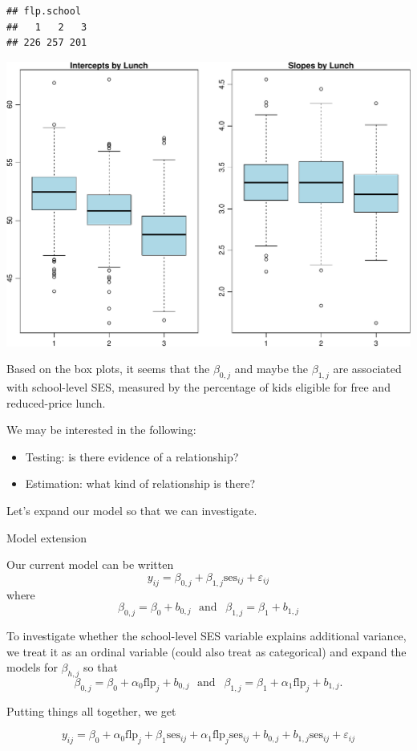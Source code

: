 \documentclass[ignorenonframetext,]{beamer}
\providecommand{\tightlist}{%
  \setlength{\itemsep}{0pt}\setlength{\parskip}{0pt}}
\begin{document}
\begin{frame}[fragile]{}

\begin{verbatim}
## flp.school
##   1   2   3 
## 226 257 201
\end{verbatim}

\includegraphics{ancova_01_deck_files/figure-beamer/ses2-1.pdf}

\end{frame}

\begin{frame}{}

Based on the box plots, it seems that the \(\beta_{0,j}\) and maybe the
\(\beta_{1,j}\) are associated with school-level SES, measured by the
percentage of kids eligible for free and reduced-price lunch.

We may be interested in the following:

\begin{itemize}
\tightlist
\item
  Testing: is there evidence of a relationship?
\item
  Estimation: what kind of relationship is there?
\end{itemize}

Let's expand our model so that we can investigate.

\end{frame}

\begin{frame}{Model extension}

Our current model can be written
\[y_{ij}=\beta_{0,j}+\beta_{1,j}\text{ses}_{ij}+\varepsilon_{ij}\] where
\[\beta_{0,j}=\beta_0+b_{0,j} ~~~ \text{and } ~~ \beta_{1,j}=\beta_1+b_{1,j}\]

To investigate whether the school-level SES variable explains additional
variance, we treat it as an ordinal variable (could also treat as
categorical) and expand the models for \(\beta_{h,j}\) so that
\[\beta_{0,j}=\beta_0+\alpha_0\text{flp}_j+b_{0,j} ~~~ \text{and } ~~ \beta_{1,j}=\beta_1+\alpha_1\text{flp}_j+b_{1,j}.\]

Putting things all together, we get

\[y_{ij}=\beta_0+\alpha_0\text{flp}_j+\beta_1\text{ses}_{ij}+\alpha_1\text{flp}_j\text{ses}_{ij}+b_{0,j}+b_{1,j}\text{ses}_{ij}+\varepsilon_{ij}\]

\end{frame}
\end{document}
